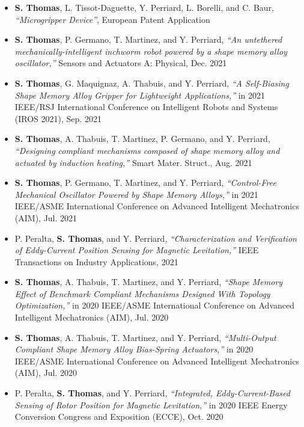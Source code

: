 \begin{itemize}
    \setlength\itemsep{0em}
\item[] \textbf{S. Thomas}, L. Tissot-Daguette, Y. Perriard, L. Borelli, and C. Baur, \textit{“Microgripper Device”}, European Patent Application\\
\item[] \textbf{S. Thomas}, P. Germano, T. Martinez, and Y. Perriard, \textit{“An untethered mechanically-intelligent inchworm robot powered by a shape memory alloy oscillator,”} Sensors and Actuators A: Physical, Dec. 2021\\
\newpage
\item[] \textbf{S. Thomas}, G. Maquignaz, A. Thabuis, and Y. Perriard, \textit{“A Self-Biasing Shape Memory Alloy Gripper for Lightweight Applications,”} in 2021 IEEE/RSJ International Conference on Intelligent Robots and Systems (IROS 2021), Sep. 2021\\
\item[] \textbf{S. Thomas}, A. Thabuis, T. Martinez, P. Germano, and Y. Perriard, \textit{“Designing compliant mechanisms composed of shape memory alloy and actuated by induction heating,”} Smart Mater. Struct., Aug. 2021\\
\item[] \textbf{S. Thomas}, P. Germano, T. Martinez, and Y. Perriard, \textit{“Control-Free Mechanical Oscillator Powered by Shape Memory Alloys,”} in 2021 IEEE/ASME International Conference on Advanced Intelligent Mechatronics (AIM), Jul. 2021\\
\item[] P. Peralta, \textbf{S. Thomas}, and Y. Perriard, \textit{“Characterization and Verification of Eddy-Current Position Sensing for Magnetic Levitation,”} IEEE Transactions on Industry Applications, 2021\\
\item[] \textbf{S. Thomas}, A. Thabuis, T. Martinez, and Y. Perriard, \textit{“Shape Memory Effect of Benchmark Compliant Mechanisms Designed With Topology Optimization,”} in 2020 IEEE/ASME International Conference on Advanced Intelligent Mechatronics (AIM), Jul. 2020\\
\item[] \textbf{S. Thomas}, A. Thabuis, T. Martinez, and Y. Perriard, \textit{“Multi-Output Compliant Shape Memory Alloy Bias-Spring Actuators,”} in 2020 IEEE/ASME International Conference on Advanced Intelligent Mechatronics (AIM), Jul. 2020\\
\item[] P. Peralta, \textbf{S. Thomas}, and Y. Perriard, \textit{“Integrated, Eddy-Current-Based Sensing of Rotor Position for Magnetic Levitation,”} in 2020 IEEE Energy Conversion Congress and Exposition (ECCE), Oct. 2020\\

\end{itemize}
